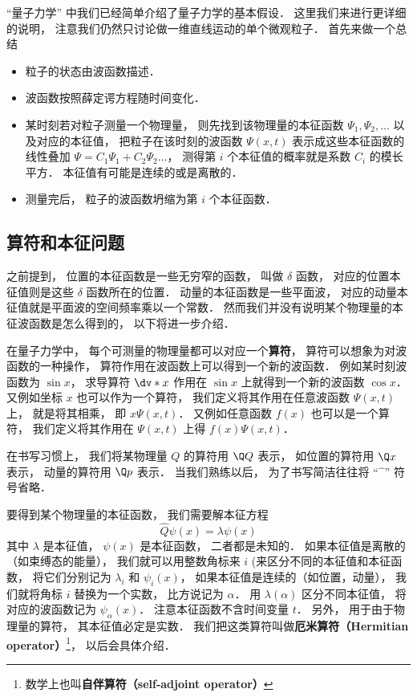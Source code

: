 


“量子力学” 中我们已经简单介绍了量子力学的基本假设． 这里我们来进行更详细的说明， 注意我们仍然只讨论做一维直线运动的单个微观粒子． 首先来做一个总结
\begin{itemize}
\item 粒子的状态由波函数描述．
\item 波函数按照薛定谔方程随时间变化．
\item 某时刻若对粒子测量一个物理量， 则先找到该物理量的本征函数 $\Psi_1, \Psi_2, \dots$ 以及对应的本征值， 把粒子在该时刻的波函数 $\Psi(x, t)$ 表示成这些本征函数的线性叠加 $\Psi = C_1 \Psi_1 + C_2 \Psi_2\dots$， 测得第 $i$ 个本征值的概率就是系数 $C_i$ 的模长平方． 本征值有可能是连续的或是离散的．
\item 测量完后， 粒子的波函数坍缩为第 $i$ 个本征函数．
\end{itemize}

\subsection{算符和本征问题}
之前提到， 位置的本征函数是一些无穷窄的函数， 叫做 $\delta$ 函数， 对应的位置本征值则是这些 $\delta$ 函数所在的位置． 动量的本征函数是一些平面波， 对应的动量本征值就是平面波的空间频率乘以一个常数． 然而我们并没有说明某个物理量的本征波函数是怎么得到的， 以下将进一步介绍．

在量子力学中， 每个可测量的物理量都可以对应一个\textbf{算符}， 算符可以想象为对波函数的一种操作， 算符作用在波函数上可以得到一个新的波函数． 例如某时刻波函数为 $\sin x$， 求导算符 $\dv*{x}$ 作用在 $\sin x$ 上就得到一个新的波函数 $\cos x$． 又例如坐标 $x$ 也可以作为一个算符， 我们定义将其作用在任意波函数 $\Psi(x, t)$ 上， 就是将其相乘， 即 $x\Psi(x, t)$． 又例如任意函数 $f(x)$ 也可以是一个算符， 我们定义将其作用在 $\Psi(x, t)$ 上得 $f(x)\Psi(x, t)$．

在书写习惯上， 我们将某物理量 $Q$ 的算符用 $\Q Q$ 表示， 如位置的算符用 $\Q x$ 表示， 动量的算符用 $\Q p$ 表示． 当我们熟练以后， 为了书写简洁往往将 “$\hat{\phantom{x}}$” 符号省略．

要得到某个物理量的本征函数， 我们需要解本征方程
\begin{equation}
\hat Q \psi(x) = \lambda \psi(x)
\end{equation}
其中 $\lambda$ 是本征值， $\psi(x)$ 是本征函数， 二者都是未知的． 如果本征值是离散的（如束缚态的能量）， 我们就可以用整数角标来 $i$ (来区分不同的本征值和本征函数， 将它们分别记为 $\lambda_i$ 和 $\psi_i(x)$， 如果本征值是连续的（如位置，动量）， 我们就将角标 $i$ 替换为一个实数， 比方说记为 $\alpha$． 用 $\lambda(\alpha)$ 区分不同本征值， 将对应的波函数记为 $\psi_\alpha(x)$． 注意本征函数不含时间变量 $t$． 另外， 用于由于物理量的算符， 其本征值必定是实数． 我们把这类算符叫做\textbf{厄米算符（Hermitian operator）}\footnote{数学上也叫\textbf{自伴算符（self-adjoint operator）}}， 以后会具体介绍．

